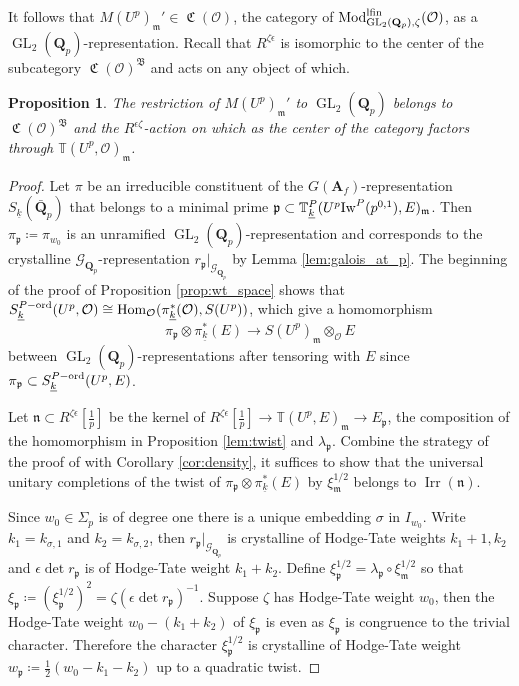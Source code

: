 \documentclass[leqno]{amsart}
\newtheorem{prop}[thm]{Proposition}
\theoremstyle{definition}
\theoremstyle{remark}
\newcommand{\oo}{\mathcal{O}}
\newcommand{\Q}{{\mathbf{Q}}}
\newcommand{\Qp}{\mathbf{Q}_p}
\newcommand{\A}{\mathbf A}
\DeclareMathOperator{\Hom}{Hom}
\DeclareMathOperator{\GL}{GL}
\newcommand{\fm}{\mathfrak{m}}
\newcommand{\fn}{\mathfrak{n}}
\newcommand{\fp}{\mathfrak{p}}
\DeclareMathOperator{\Mod}{\textnormal{Mod}}
\DeclareMathOperator{\fC}{\mathfrak{C}} %
\DeclareMathOperator{\Irr}{Irr}
\newcommand{\Gp}{\mathcal{G}_{\Qp}} %
\newcommand{\B}{\mathfrak B} %
\newcommand{\lfin}{\textnormal{lfin}}
\newcommand{\wt}[1]{\underline{ #1 }}
\newcommand{\Iw}{\textnormal{Iw}} %
\newcommand{\TT}{\mathbb{T}} %
\newcommand{\ord}{\textnormal{ord}} %
\begin{document}
It follows that
$M(U^p)_{\fm}'\in \fC(\oo)$, the category of
$\Mod^{\lfin}_{\GL_2(\Qp),\zeta}(\oo)$,
as a $\GL_2(\Qp)$-representation.
Recall that $R^{\zeta\epsilon}$
is isomorphic to the center of the subcategory $\fC(\oo)^{\B}$
and acts on any object of which.

\begin{prop}\label{prop:compatibility}
    The restriction of  $M(U^p)_{\fm}'$ to $\GL_2(\Qp)$
    belongs to $\fC(\oo)^{\B}$
	and the $R^{\epsilon\zeta}$-action on which
    as the center of the category
	factors through $\TT(U^p,\oo)_\fm$.
\end{prop}

\begin{proof}

Let $\pi$ be an irreducible constituent of
the $G(\A_f)$-representation $S_{\wt{k}}(\bar{\Q}_p)$
that belongs to a minimal prime
$\fp\subset \TT_{\wt{k}}^P(U^p\Iw^P(p^{0,1}),E)_{\fm}$.
Then $\pi_{\fp}\coloneqq\pi_{w_0}$
is an unramified $\GL_2(\Qp)$-representation
and corresponds to the crystalline $\Gp$-representation
$r_\fp\vert_{\Gp}$ by Lemma \ref{lem:galois_at_p}.
The beginning of the proof of
Proposition \ref{prop:wt_space} shows that 
$S_{\wt{k}}^{P-\ord}(U^p,\oo)\cong
\Hom_{\oo}(\pi_{\wt{k}}^*(\oo), S(U^p))$,
which give a homomorphism
\begin{equation}\label{eq:hom_wt}
    \pi_\fp\otimes \pi_{\wt{k}}^*(E)\to S(U^p)_\fm\otimes_{\oo}E
\end{equation}
between $\GL_2(\Qp)$-representations
after tensoring with $E$ since
$\pi_\fp\subset S^{P-\ord}_{\wt{k}}(U^p,E)$.


Let $\fn\subset R^{\zeta\epsilon}[\frac{1}{p}]$ be the kernel of 
$R^{\zeta\epsilon}[\frac{1}{p}]\to \TT(U^p,E)_{\fm}\to E_\fp$,
the composition of the homomorphism in Proposition \ref{lem:twist}
and $\lambda_\fp$.
Combine the strategy of the proof of \cite[Thm 3.5.5]{pan}
with Corollary \ref{cor:density},
it suffices to show that
the universal unitary completions of
the twist of $\pi_{\fp}\otimes\pi_{\wt{k}}^*(E)$
by $\xi_\fm^{1/2}$ belongs to $\Irr(\fn)$.

Since $w_0\in \Sigma_p$ is of degree one
there is a unique embedding $\sigma$ in $I_{w_0}$.
Write $k_1=k_{\sigma,1}$ and $k_2=k_{\sigma,2}$,
then $r_\fp\vert_{\Gp}$ is crystalline
of Hodge-Tate weights  $k_1+1,k_2$
and $\epsilon\det r_{\fp}$
is of Hodge-Tate weight $k_1+k_2$.
Define $\xi_\fp^{1/2}=\lambda_\fp\circ \xi_\fm^{1/2}$
so that $\xi_\fp\coloneqq(\xi_\fp^{1/2})^2=
\zeta(\epsilon\det r_\fp)^{-1}$.
Suppose $\zeta$ has Hodge-Tate weight $w_0$,
then the Hodge-Tate weight $w_0-(k_1+k_2)$ of
$\xi_\fp$ is even as $\xi_\fp$
is congruence to the trivial character.
Therefore the character $\xi_{\fp}^{1/2}$
is crystalline of Hodge-Tate weight 
$w_{\fp}\coloneqq \frac{1}{2}(w_0-k_1-k_2)$ 
up to a quadratic twist.


\end{proof}
\end{document}
